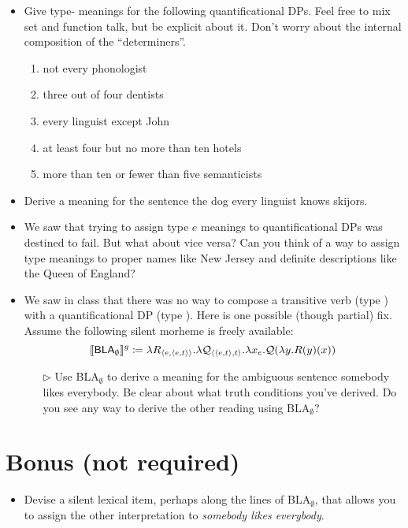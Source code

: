 \begin{itemize}
	\item Give type- meanings for the following quantificational DPs. Feel free to mix set and function talk, but be explicit about it. Don't worry about the internal composition of the ``determiners''.%
	\begin{enumerate}
		\item not every phonologist
		\item three out of four dentists
		\item every linguist except John
		\item at least four but no more than ten hotels
		\item more than ten or fewer than five semanticists
	\end{enumerate}
	
	\item Derive a meaning for the sentence \textsf{the dog every linguist knows skijors}.%
	
	\item We saw that trying to assign type $e$ meanings to quantificational DPs was destined to fail. But what about vice versa? Can you think of a way to assign type  meanings to proper names like \textsf{New Jersey} and definite descriptions like \textsf{the Queen of England}?%
	
	
	\item We saw in class that there was no way to compose a transitive verb (type ) with a quantificational DP (type ). Here is one possible (though partial) fix. Assume the following silent morheme is freely available:  %
	\[\llbracket \textsf{BLA}_\emptyset \rrbracket^g \coloneqq \lambda R_{\langle e,\langle e,t \rangle \rangle}.\lambda {\cal Q}_{\langle \langle e,t \rangle,t \rangle}.\lambda x_e.{\cal Q}(\lambda y.R(y)(x))\]%
	\begin{itemize}
		\item[$\rhd$] Use \textsf{BLA}$_\emptyset$ to derive a meaning for the ambiguous sentence \textsf{somebody likes everybody}. Be clear about what truth conditions you've derived. Do you see any way to derive the other reading using \textsf{BLA}$_\emptyset$? %
	\end{itemize}
\end{itemize}

\section{Bonus (not required)}

\begin{itemize}
	\item Devise a silent lexical item, perhaps along the lines of \textsf{BLA}$_\emptyset$, that allows you to assign the other interpretation to \emph{somebody likes everybody}.%
\end{itemize}

